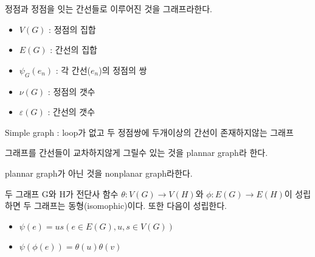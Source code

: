 \documentclass{oblivoir}
\begin{document}
    \begin{dfn}[Graph] 정점과 정점을 잇는 간선들로 이루어진 것을 그래프라한다.
        \begin{itemize}
            \item $V(G)$ :  정점의 집합
            \item $E(G)$ :  간선의 집합
            \item $\psi_G(e_n)$ :  각 간선($e_n$)의 정점의 쌍
            \item $\nu(G)$ :  정점의 갯수 
            \item $\varepsilon(G)$ :  간선의 갯수
        \end{itemize}

        Simple graph : loop가 없고 두 정점쌍에 두개이상의 간선이 존재하지않는 그래프
    \end{dfn}

    \begin{dfn}[planar]
        그래프를 간선들이 교차하지않게 그릴수 있는 것을 plannar graph라 한다. 
        
        plannar graph가 아닌 것을 nonplanar graph라한다.
    \end{dfn}
    \begin{dfn}[isomophic] 두 그래프 G와 H가  전단사 함수 $\theta : V(G) \longrightarrow V(H)$와 $\phi : E(G) \rightarrow E(H)$이 성립하면 두 그래프는 동형(isomophic)이다.
        또한 다음이 성립한다.
    \begin{itemize}
        \item $\psi(e) = us( e \in E(G), u,s \in V(G)) $
        \item $\psi(\phi(e)) = \theta(u)\theta(v)$%
    \end{itemize}
    \end{dfn}
    
\end{document}
